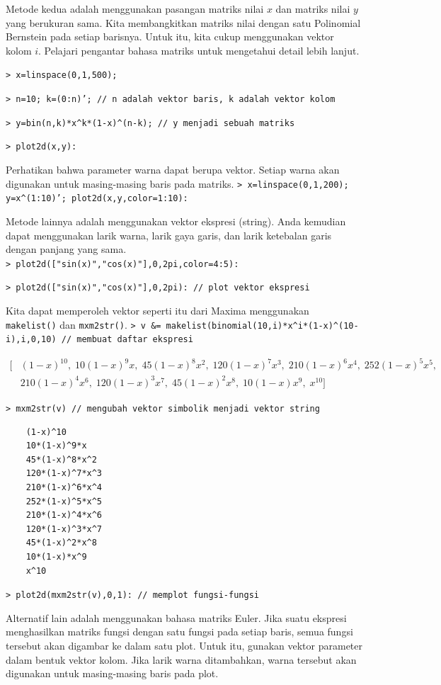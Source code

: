 \documentclass[11pt, a4paper]{article}
\newcommand{\emtcmd}[1]{\noindent\texttt{\textcolor{emtcommand}{>}\ #1}\par\smallskip}
\begin{document}
Metode kedua adalah menggunakan pasangan matriks nilai $x$ dan matriks nilai $y$ yang berukuran sama. Kita membangkitkan matriks nilai dengan satu Polinomial Bernstein pada setiap barisnya. Untuk itu, kita cukup menggunakan vektor kolom $i$. Pelajari pengantar bahasa matriks untuk mengetahui detail lebih lanjut.

\emtcmd{x=linspace(0,1,500);}
\emtcmd{n=10; k=(0:n)'; \textcolor{emtcomment}{// n adalah vektor baris, k adalah vektor kolom}}
\emtcmd{y=bin(n,k)*x\^{}k*(1-x)\^{}(n-k); \textcolor{emtcomment}{// y menjadi sebuah matriks}}
\emtcmd{plot2d(x,y):}

Perhatikan bahwa parameter warna dapat berupa vektor. Setiap warna akan digunakan untuk masing-masing baris pada matriks.
\emtcmd{x=linspace(0,1,200); y=x\^{}(1:10)'; plot2d(x,y,color=1:10):}

Metode lainnya adalah menggunakan vektor ekspresi (string). Anda kemudian dapat menggunakan larik warna, larik gaya garis, dan larik ketebalan garis dengan panjang yang sama.
\emtcmd{plot2d(["sin(x)","cos(x)"],0,2pi,color=4:5):}
\emtcmd{plot2d(["sin(x)","cos(x)"],0,2pi): \textcolor{emtcomment}{// plot vektor ekspresi}}

Kita dapat memperoleh vektor seperti itu dari Maxima menggunakan \texttt{makelist()} dan \texttt{mxm2str()}.
\emtcmd{v \&= makelist(binomial(10,i)*x\^{}i*(1-x)\^{}(10-i),i,0,10) \textcolor{emtcomment}{// membuat daftar ekspresi}}
$$\begin{aligned}
\big[&(1-x)^{10},\; 10(1-x)^9 x,\; 45(1-x)^8 x^2,\; 120(1-x)^7 x^3,\; 210(1-x)^6 x^4,\; 252(1-x)^5 x^5,\\
&210(1-x)^4 x^6,\; 120(1-x)^3 x^7,\; 45(1-x)^2 x^8,\; 10(1-x)x^9,\; x^{10}\big]
\end{aligned}$$

\emtcmd{mxm2str(v) \textcolor{emtcomment}{// mengubah vektor simbolik menjadi vektor string}}
\begin{verbatim}
    (1-x)^10
    10*(1-x)^9*x
    45*(1-x)^8*x^2
    120*(1-x)^7*x^3
    210*(1-x)^6*x^4
    252*(1-x)^5*x^5
    210*(1-x)^4*x^6
    120*(1-x)^3*x^7
    45*(1-x)^2*x^8
    10*(1-x)*x^9
    x^10
\end{verbatim}

\emtcmd{plot2d(mxm2str(v),0,1): \textcolor{emtcomment}{// memplot fungsi-fungsi}}

Alternatif lain adalah menggunakan bahasa matriks Euler. Jika suatu ekspresi menghasilkan matriks fungsi dengan satu fungsi pada setiap baris, semua fungsi tersebut akan digambar ke dalam satu plot. Untuk itu, gunakan vektor parameter dalam bentuk vektor kolom. Jika larik warna ditambahkan, warna tersebut akan digunakan untuk masing-masing baris pada plot.
\end{document}
